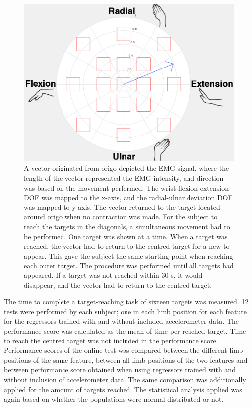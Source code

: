 \documentclass[a4paper, 10pt, conference]{ieeeconf}      %
\begin{document}
\begin{figure}[H]
	\centering
	\includegraphics[scale=0.25]{Figures/Target}
	\caption{A vector originated from origo depicted the EMG signal, where the length of the vector represented the EMG intensity, and direction was based on the movement performed. The wrist flexion-extension DOF was mapped to the x-axis, and the radial-ulnar deviation DOF was mapped to y-axis. The vector returned to the target located around origo when no contraction was made. For the subject to reach the targets in the diagonals, a simultaneous movement had to be performed. One target was shown at a time. When a target was reached, the vector had to return to the centred target for a new to appear. This gave the subject the same starting point when reaching each outer target. The procedure was performed until all targets had appeared. If a target was not reached within 30 s, it would disappear, and the vector had to return to the centred target.}
	\label{fig:targets}
\end{figure}

The time to complete a target-reaching task of sixteen targets was measured. 12 tests were performed by each subject; one in each limb position for each feature for the regressors trained with and without included accelerometer data. The performance score was calculated as the mean of time per reached target. Time to reach the centred target was not included in the performance score. Performance scores of the online test was compared between the different limb positions of the same feature, between all limb positions of the two features and between performance score obtained when using regressors trained with and without inclusion of accelerometer data. The same comparison was additionally applied for the amount of targets reached. The statistical analysis applied was again based on whether the populations were normal distributed or not. 
\end{document}
